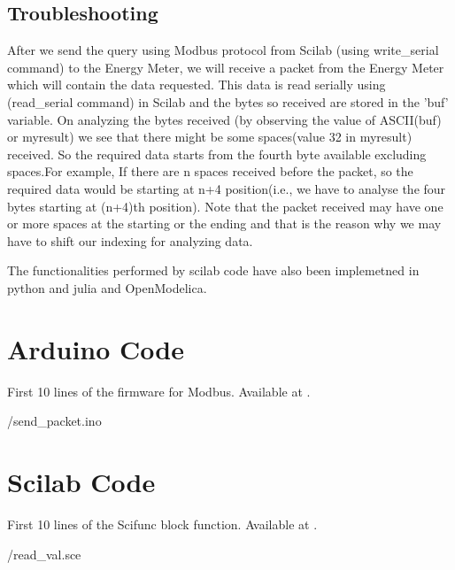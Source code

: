 \subsection{Troubleshooting}
After we send the query using Modbus protocol from Scilab (using
write\_serial command) to the Energy Meter, we will receive a packet
from the Energy Meter which will contain the data requested. This data
is read serially using (read\_serial command) in Scilab and the bytes
so received are stored in the 'buf' variable. On analyzing the bytes
received (by observing the value of ASCII(buf) or myresult) we see
that there might be some spaces(value 32 in myresult) received. So the
required data starts from the fourth byte available excluding
spaces.For example, If there are n spaces received before the packet,
so the required data would be starting at n+4 position(i.e., we have
to analyse the four bytes starting at (n+4)th position). Note that the
packet received may have one or more spaces at the starting or the
ending and that is the reason why we may have to shift our indexing
for analyzing data.

The functionalities performed by scilab code have also been implemetned in 
python and julia and OpenModelica.

\clearpage
\section{Arduino Code}
\label{sec:firmware-modbus}

\begin{ardcode}
{First 10 lines of the firmware for Modbus.  Available at
  .}
\label{ard:firmware-modbus}

{\LocMODardcode/send_packet.ino}
\end{ardcode}


\section{Scilab Code}
\label{sec:modbus-scilab-code}

\begin{scicode}
{First 10 lines of the Scifunc block function.  Available at
  .} 
\label{sci:current-modbus}

{\LocMODscicode/read_val.sce}
\end{scicode}

